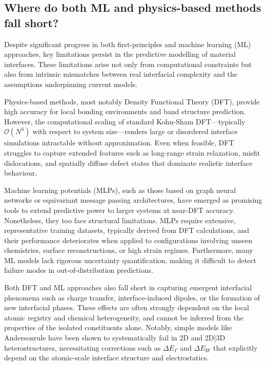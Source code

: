 \subsection{Where do both ML and physics-based methods fall short?}

Despite significant progress in both first-principles and machine learning (ML) approaches, key limitations persist in
the predictive modelling of material interfaces. These limitations arise not only from computational constraints but
also from intrinsic mismatches between real interfacial complexity and the assumptions underpinning current models.

Physics-based methods, most notably Density Functional Theory (DFT), provide high accuracy for local bonding
environments and band structure prediction. However, the computational scaling of standard Kohn-Sham DFT---typically
$\mathcal{O}(N^3)$ with respect to system size---renders large or disordered interface simulations intractable without
approximation. Even when feasible, DFT struggles to capture extended features such as long-range strain relaxation,
misfit dislocations, and spatially diffuse defect states that dominate realistic interface behaviour.

Machine learning potentials (MLPs), such as those based on graph neural networks or equivariant message passing
architectures, have emerged as promising tools to extend predictive power to larger systems at near-DFT accuracy.
Nonetheless, they too face structural limitations. MLPs require extensive, representative training datasets, typically
derived from DFT calculations, and their performance deteriorates when applied to configurations involving unseen
chemistries, surface reconstructions, or high strain regimes. Furthermore, many ML models lack rigorous uncertainty
quantification, making it difficult to detect failure modes in out-of-distribution predictions.

Both DFT and ML approaches also fall short in capturing emergent interfacial phenomena such as charge transfer,
interface-induced dipoles, or the formation of new interfacial phases. These effects are often strongly dependent on
the local atomic registry and chemical heterogeneity, and cannot be inferred from the properties of the isolated
constituents alone. Notably, simple models like Anderson\rqss rule have been shown to systematically fail in 2D and 2D|3D
heterostructures, necessitating corrections such as $\Delta E_\Gamma$ and $\Delta E_\mathrm{IF}$ that explicitly depend
on the atomic-scale interface structure and electrostatics.

